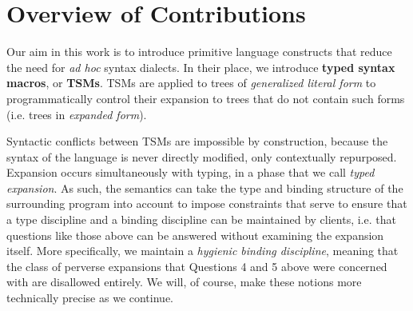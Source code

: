 





\section{Overview of Contributions}\label{sec:contributions}
Our aim in this work is to introduce primitive language constructs that reduce the need for \emph{ad hoc} syntax dialects. In their place, we 
introduce \textbf{typed syntax macros}, or \textbf{TSMs}. TSMs are applied to trees of \emph{generalized literal form} to programmatically control their expansion to trees that do not contain such forms (i.e. trees in \emph{expanded form}).

Syntactic conflicts between TSMs are impossible by construction, because the syntax of the language is never directly modified, only contextually repurposed. Expansion occurs simultaneously with typing, in a phase that we call \emph{typed expansion}. As such, the semantics can take the type and binding structure of the surrounding program into account to impose constraints that serve to ensure that a type discipline and a binding discipline can be maintained by clients, i.e. that questions like those above can be answered without examining the expansion itself. More specifically, we maintain a \emph{hygienic binding discipline}, meaning that the class of perverse expansions that Questions 4 and 5 above were concerned with are disallowed entirely. We will, of course, make these notions more technically precise as we continue.

